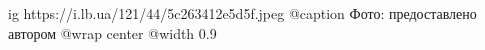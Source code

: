  
 
 
 
 

\ifcmt
  ig https://i.lb.ua/121/44/5c263412e5d5f.jpeg
	@caption Фото: предоставлено автором
  @wrap center
  @width 0.9
\fi
